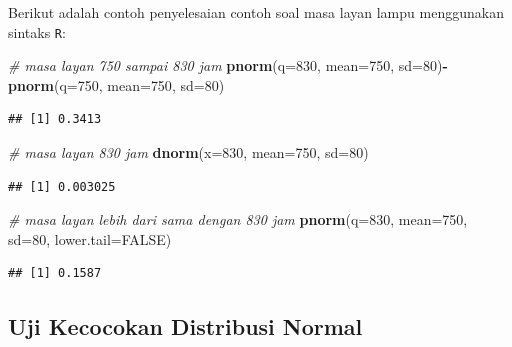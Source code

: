 \documentclass[]{book}
\newenvironment{Shaded}{\begin{snugshade}}{\end{snugshade}}
\newcommand{\KeywordTok}[1]{\textcolor[rgb]{0.13,0.29,0.53}{\textbf{#1}}}
\newcommand{\DataTypeTok}[1]{\textcolor[rgb]{0.13,0.29,0.53}{#1}}
\newcommand{\DecValTok}[1]{\textcolor[rgb]{0.00,0.00,0.81}{#1}}
\newcommand{\CommentTok}[1]{\textcolor[rgb]{0.56,0.35,0.01}{\textit{#1}}}
\newcommand{\OtherTok}[1]{\textcolor[rgb]{0.56,0.35,0.01}{#1}}
\newcommand{\OperatorTok}[1]{\textcolor[rgb]{0.81,0.36,0.00}{\textbf{#1}}}
\newcommand{\NormalTok}[1]{#1}
\begin{document}
Berikut adalah contoh penyelesaian contoh soal masa layan lampu
menggunakan sintaks \texttt{R}:

\begin{Shaded}
\begin{Highlighting}[]
\CommentTok{# masa layan 750 sampai 830 jam}
\KeywordTok{pnorm}\NormalTok{(}\DataTypeTok{q=}\DecValTok{830}\NormalTok{, }\DataTypeTok{mean=}\DecValTok{750}\NormalTok{, }\DataTypeTok{sd=}\DecValTok{80}\NormalTok{)}\OperatorTok{-}\KeywordTok{pnorm}\NormalTok{(}\DataTypeTok{q=}\DecValTok{750}\NormalTok{, }\DataTypeTok{mean=}\DecValTok{750}\NormalTok{, }\DataTypeTok{sd=}\DecValTok{80}\NormalTok{)}
\end{Highlighting}
\end{Shaded}

\begin{verbatim}
## [1] 0.3413
\end{verbatim}

\begin{Shaded}
\begin{Highlighting}[]
\CommentTok{# masa layan 830 jam}
\KeywordTok{dnorm}\NormalTok{(}\DataTypeTok{x=}\DecValTok{830}\NormalTok{, }\DataTypeTok{mean=}\DecValTok{750}\NormalTok{, }\DataTypeTok{sd=}\DecValTok{80}\NormalTok{)}
\end{Highlighting}
\end{Shaded}

\begin{verbatim}
## [1] 0.003025
\end{verbatim}

\begin{Shaded}
\begin{Highlighting}[]
\CommentTok{# masa layan lebih dari sama dengan 830 jam}
\KeywordTok{pnorm}\NormalTok{(}\DataTypeTok{q=}\DecValTok{830}\NormalTok{, }\DataTypeTok{mean=}\DecValTok{750}\NormalTok{, }\DataTypeTok{sd=}\DecValTok{80}\NormalTok{, }\DataTypeTok{lower.tail=}\OtherTok{FALSE}\NormalTok{)}
\end{Highlighting}
\end{Shaded}

\begin{verbatim}
## [1] 0.1587
\end{verbatim}

\subsection{Uji Kecocokan Distribusi
Normal}\label{uji-kecocokan-distribusi-normal}
\end{document}
